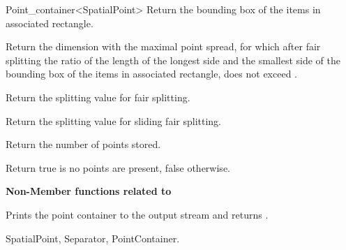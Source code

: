 \begin{ccRefClass}{Point_container<SpatialPoint>}
{Return the bounding box of the items in associated rectangle.}

{Return the dimension with the maximal point spread, for which after fair splitting
the ratio of the length of the longest side and the smallest side of the bounding box of
the items in associated rectangle,
does not exceed .}

{Return the splitting value for fair splitting.}

{Return the splitting value for sliding fair splitting.}

{
Return the number of points stored.
}

{
Return true is no points are present, false otherwise.
}



\begin{ccAdvanced}

{\bf Non-Member functions related to }

\ccGlueBegin
{}
{Prints the point container  to the output stream  and returns .}
\ccGlueEnd

\end{ccAdvanced}

\ccSeeAlso

SpatialPoint, Separator, PointContainer.

\end{ccRefClass}


